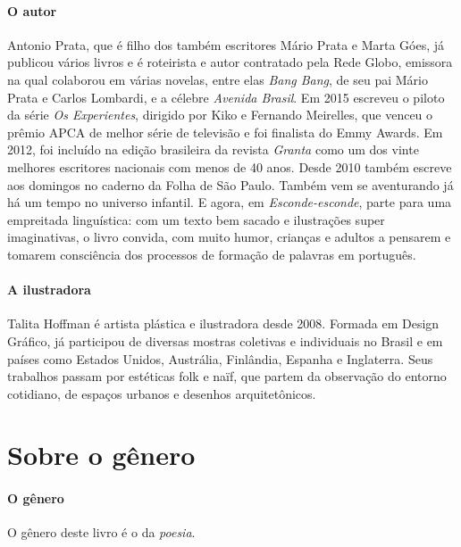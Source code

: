 \documentclass[11pt]{extarticle}
\begin{document}
\paragraph{O autor} Antonio Prata, que é  filho dos também escritores Mário Prata e Marta Góes, já publicou vários livros e é roteirista e autor contratado pela Rede Globo, emissora na qual colaborou em várias novelas, entre elas \textit{Bang Bang}, de seu pai Mário Prata e Carlos Lombardi, e a célebre \textit{Avenida Brasil}. Em 2015 escreveu o piloto da série \textit{Os Experientes}, dirigido por Kiko e Fernando Meirelles, que venceu o prêmio APCA de melhor série de televisão e foi finalista do Emmy Awards. Em 2012, foi incluído na edição brasileira da revista \textit{Granta} como um dos vinte melhores escritores nacionais com menos de 40 anos. Desde 2010 também escreve aos domingos no caderno da Folha de São Paulo. Também vem se aventurando já há um tempo no universo infantil. E agora, em \textit{Esconde-esconde}, parte para uma empreitada linguística: com um texto bem sacado e ilustrações super imaginativas, o livro convida, com muito humor, crianças e adultos a pensarem e tomarem consciência dos processos de formação de palavras em português.

\paragraph{A ilustradora} Talita Hoffman é artista plástica e ilustradora desde 2008. Formada em
Design Gráfico, já participou de diversas mostras
coletivas e individuais no Brasil e em países como Estados Unidos,
Austrália, Finlândia, Espanha e Inglaterra. Seus trabalhos passam por
estéticas folk e naïf, que partem da observação do entorno cotidiano, de
espaços urbanos e desenhos arquitetônicos.

\section{Sobre o gênero}

\paragraph{O gênero} O gênero deste livro é o da \textit{poesia}. 
\end{document}
